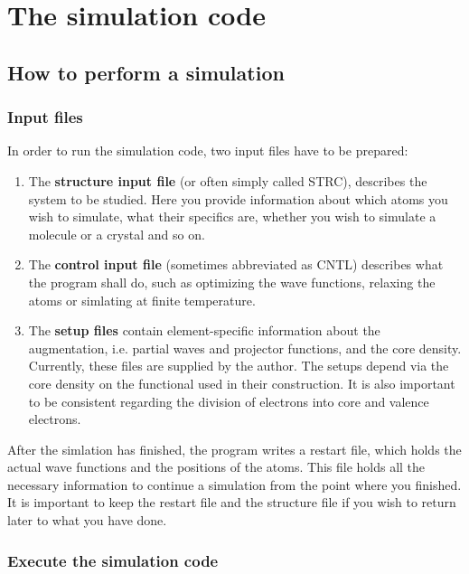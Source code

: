 \documentclass[final,12pt]{article}
\begin{document}
\section{The simulation code}

\subsection{How to perform a simulation}

\subsubsection{Input files}

In order to run the simulation code, two input files have to be
prepared:

\begin{enumerate}
\item The {\bf structure input file} (or often simply called STRC),
  describes the system to be studied. Here you provide information
  about which atoms you wish to simulate, what their specifics
  are, whether you wish to simulate a molecule or a crystal and so on.
\item The {\bf control input file} (sometimes abbreviated as CNTL)
  describes what the program shall do, such as optimizing the wave
  functions, relaxing the atoms or simlating at finite temperature.
\item The {\bf setup files} contain element-specific information about
  the augmentation, i.e. partial waves and projector functions, and
  the core density.  Currently, these files are supplied by the
  author.  The setups depend via the core density on the functional
  used in their construction. It is also important to be consistent
  regarding the 
  division of electrons into  core and valence electrons.
\end{enumerate}

After the simlation has finished, the program writes a restart file, which
holds the actual wave functions and the positions of the atoms. This
file holds all the necessary information to continue a simulation from
the point where you finished.  It is important to keep the restart file
and the structure file if you wish to return later to what you have
done. 

\subsubsection{Execute the simulation code}
\end{document}
